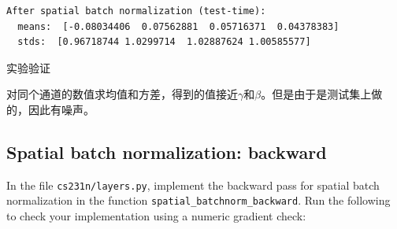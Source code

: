 \documentclass[11pt]{article}
\begin{document}
    \begin{Verbatim}[commandchars=\\\{\}]
After spatial batch normalization (test-time):
  means:  [-0.08034406  0.07562881  0.05716371  0.04378383]
  stds:  [0.96718744 1.0299714  1.02887624 1.00585577]

    \end{Verbatim}

    实验验证

对同个通道的数值求均值和方差，得到的值接近\(\gamma\)和\(\beta\)。但是由于是测试集上做的，因此有噪声。

    \hypertarget{spatial-batch-normalization-backward}{%
\subsection{Spatial batch normalization:
backward}\label{spatial-batch-normalization-backward}}

In the file \texttt{cs231n/layers.py}, implement the backward pass for
spatial batch normalization in the function
\texttt{spatial\_batchnorm\_backward}. Run the following to check your
implementation using a numeric gradient check:
\end{document}
